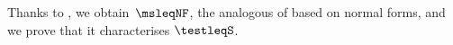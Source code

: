 \noindent
Thanks to , we obtain~$\msleqNF$, the analogous of
 based on normal forms, and we prove that it characterises
$\testleqS$.













